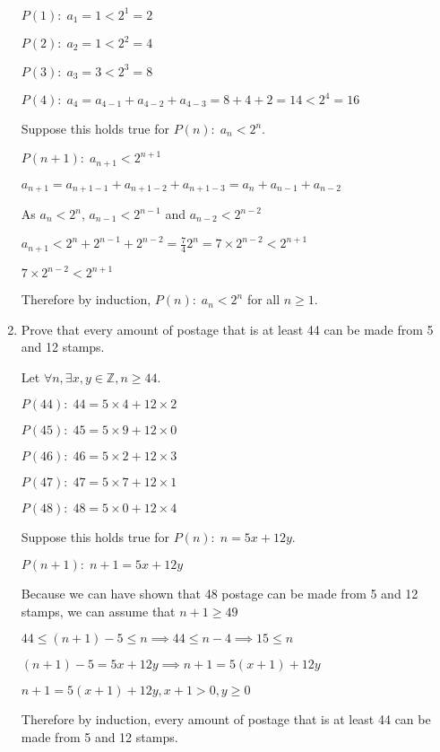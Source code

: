 \documentclass[12pt,letterpaper,titlepage]{article}
\begin{document}
\begin{raggedright}
\begin{enumerate}
$P(1):\; a_1 = 1 < 2^1 = 2$

$P(2):\; a_2 = 1 < 2^2 = 4$

$P(3):\; a_3 = 3 < 2^3 = 8$

$P(4):\; a_4 = a_{4−1} + a_{4−2} + a_{4−3} = 8 + 4 + 2 = 14 < 2^4 = 16$

Suppose this holds true for $P(n):\; a_n < 2^n$.

$P(n+1):\; a_{n+1} < 2^{n+1}$

$a_{n+1} = a_{n+1−1} + a_{n+1−2} + a_{n+1−3} = a_n + a_{n−1} + a_{n−2}$

As $a_n < 2^n$, $a_{n-1} < 2^{n-1}$ and $a_{n-2} < 2^{n-2}$

$a_{n+1} < 2^n + 2^{n-1} + 2^{n-2} = \frac{7}{4}2^n = 7\times 2^{n-2} < 2^{n+1}$

$7\times 2^{n-2} < 2^{n+1}$

Therefore by induction, $P(n):\; a_n < 2^n$ for all $n \geq 1$.

\clearpage
\item Prove that every amount of postage that is at least 44\textcent{} can be made from 5\textcent{} and 12\textcent{} stamps.

Let $\forall n, \exists x, y \in \mathbb{Z}, n \geq 44$.

$P(44):\; 44 = 5\times 4 + 12\times 2$

$P(45):\; 45 = 5\times 9 + 12\times 0$

$P(46):\; 46 = 5\times 2 + 12\times 3$

$P(47):\; 47 = 5\times 7 + 12\times 1$

$P(48):\; 48 = 5\times 0 + 12\times 4$

Suppose this holds true for $P(n):\; n = 5x + 12y$.

$P(n+1):\; n+1 = 5x + 12y$

Because we can have shown that 48\textcent{} postage can be made from 5\textcent{} and 12\textcent{} stamps, we can assume that $n+1\geq 49$

$44\leq (n+1) - 5 \leq n\implies 44 \leq n-4\implies 15\leq n$

$(n+1)-5=5x+12y\implies n+1 = 5(x+1)+12y$

$n+1 = 5(x+1)+12y, x+1 > 0, y \geq 0$

Therefore by induction, every amount of postage that is at least 44\textcent{} can be made from 5\textcent{} and 12\textcent{} stamps.

\end{enumerate}
\end{raggedright}
\end{document}
